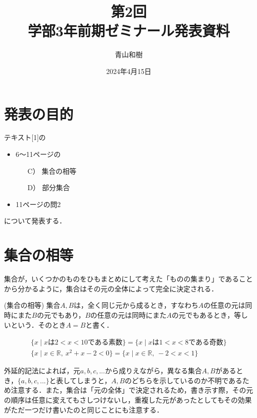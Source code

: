 \documentclass[a4j]{jsarticle}
\title{第2回\\学部3年前期ゼミナール発表資料}
\author{青山和樹}
\date{2024年4月15日}
\begin{document}
\maketitle

\section*{発表の目的}
テキスト[1]の
\begin{itemize}
	\item 6～11ページの
	\begin{itemize}
		\item[C）] 集合の相等
		\item[D）] 部分集合
	\end{itemize}
	\item 11ページの問2
\end{itemize}
について発表する．

\tableofcontents

\clearpage

\section{集合の相等}
集合が，いくつかのものをひもまとめにして考えた「ものの集まり」であることから分かるように，集合はその元の全体によって完全に決定される．

\medskip

\begin{itembox}[l]{ (集合の相等)}
集合$A, B$は，全く同じ元から成るとき，すなわち$A$の任意の元は同時にまた$B$の元でもあり，$B$の任意の元は同時にまた$A$の元でもあるとき，等しいという．そのとき$A=B$と書く．
\end{itembox}

\begin{align}
	\{x \mid xは2<x<10である素数\} = \{x \mid xは1<x<8である奇数\}\\
	\{x \mid x \in \mathbb{R},\ x^2+x-2<0 \} = \{x \mid x \in \mathbb{R},\ -2<x<1\}
\end{align}

\medskip

 外延的記法によれば，元$a, b, c, ...$から成りえながら，異なる集合$A, B$があるとき，$\{a, b, c, ...\}$と表してしまうと，$A, B$のどちらを示しているのか不明であるため注意する．また，集合は「元の全体」で決定されるため，書き示す際，その元の順序は任意に変えてもさしつけないし，重複した元があったとしてもその効果がただ一つだけ書いたのと同じことにも注意する．
\end{document}
